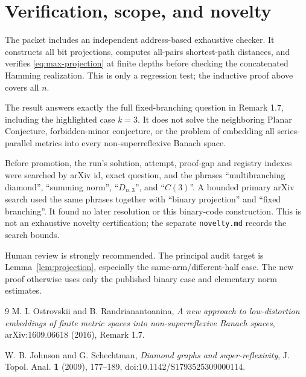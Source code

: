 \documentclass[11pt]{article}
\begin{document}
\section{Verification, scope, and novelty}

The packet includes an independent address-based exhaustive checker.  It
constructs all bit projections, computes all-pairs shortest-path distances,
and verifies \eqref{eq:max-projection} at finite depths before checking the
concatenated Hamming realization.  This is only a regression test; the
inductive proof above covers all $n$.

The result answers exactly the full fixed-branching question in Remark 1.7,
including the highlighted case $k=3$.  It does not solve the neighboring
Planar Conjecture, forbidden-minor conjecture, or the problem of embedding all
series-parallel metrics into every non-superreflexive Banach space.

Before promotion, the run's solution, attempt, proof-gap and registry indexes
were searched by arXiv id, exact question, and the phrases
``multibranching diamond'', ``summing norm'', ``$D_{n,3}$'', and ``$C(3)$''.
A bounded primary arXiv search used the same phrases together with ``binary
projection'' and ``fixed branching''.  It found no later resolution or this
binary-code construction.  This is not an exhaustive novelty certification;
the separate \texttt{novelty.md} records the search bounds.

Human review is strongly recommended.  The principal audit target is
Lemma~\ref{lem:projection}, especially the same-arm/different-half case.  The
new proof otherwise uses only the published binary case and elementary norm
estimates.

\begin{thebibliography}{9}
M. I. Ostrovskii and B. Randrianantoanina,
\emph{A new approach to low-distortion embeddings of finite metric spaces
into non-superreflexive Banach spaces}, arXiv:1609.06618 (2016), Remark 1.7.

W. B. Johnson and G. Schechtman,
\emph{Diamond graphs and super-reflexivity},
J. Topol. Anal. \textbf{1} (2009), 177--189,
doi:10.1142/S1793525309000114.
\end{thebibliography}
\end{document}
